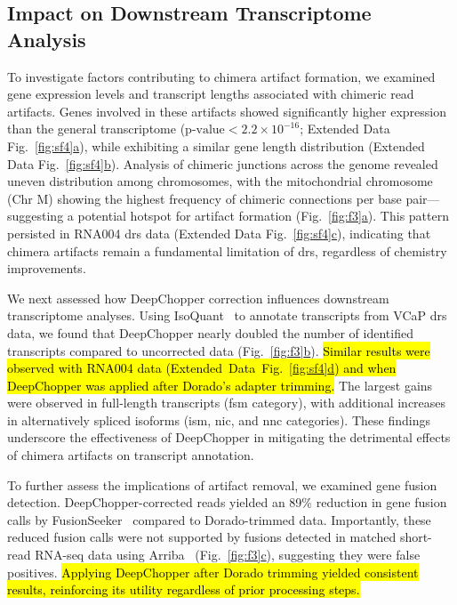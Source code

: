 \documentclass[pdflatex,sn-nature, lineno]{sn-jnl}%
\newcommand{\figref}[2]{Fig.~\hyperref[#1]{\ref*{#1}#2}}
\newcommand{\edfigref}[2]{Extended Data Fig.~\hyperref[#1]{\ref*{#1}#2}}
\begin{document}
\subsection{Impact on Downstream Transcriptome Analysis}

To investigate factors contributing to chimera artifact formation, we examined gene expression levels and transcript lengths associated with chimeric read artifacts.
Genes involved in these artifacts showed significantly higher expression than the general transcriptome (\(\textrm{p-value} < 2.2 \times 10^{-16}\); \edfigref{fig:sf4}{a}), while exhibiting a similar gene length distribution (\edfigref{fig:sf4}{b}).
Analysis of chimeric junctions across the genome revealed uneven distribution among chromosomes, with the mitochondrial chromosome (Chr M) showing the highest frequency of chimeric connections per base pair—suggesting a potential hotspot for artifact formation (\figref{fig:f3}{a}).
This pattern persisted in RNA004 \gls{drs} data (\edfigref{fig:sf4}{c}), indicating that chimera artifacts remain a fundamental limitation of \gls{drs}, regardless of chemistry improvements.

We next assessed how DeepChopper correction influences downstream transcriptome analyses.
Using IsoQuant~\cite{prjibelski2023accurate} to annotate transcripts from VCaP \gls{drs} data, we found that DeepChopper nearly doubled the number of identified transcripts compared to uncorrected data (\figref{fig:f3}{b}).
\hl{Similar results were observed with RNA004 data (\mbox{\edfigref{fig:sf4}{d}}) and when DeepChopper was applied after Dorado’s adapter trimming.}
The largest gains were observed in full-length transcripts (\gls{fsm} category), with additional increases in alternatively spliced isoforms (\gls{ism}, \gls{nic}, and \gls{nnc} categories).
These findings underscore the effectiveness of DeepChopper in mitigating the detrimental effects of chimera artifacts on transcript annotation.

To further assess the implications of artifact removal, we examined gene fusion detection. DeepChopper-corrected reads yielded an 89\% reduction in gene fusion calls by FusionSeeker~\cite{chen2023gene} compared to Dorado-trimmed data. Importantly, these reduced fusion calls were not supported by fusions detected in matched short-read RNA-seq data using Arriba~\cite{uhrig2021accurate} (\figref{fig:f3}{c}), suggesting they were false positives. \hl{Applying DeepChopper after Dorado trimming yielded consistent results, reinforcing its utility regardless of prior processing steps.}
\end{document}
